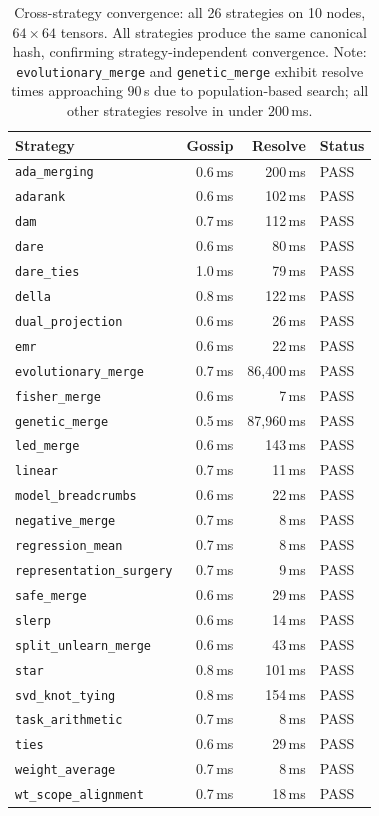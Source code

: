 \documentclass[10pt,letterpaper]{article}
\begin{document}
\begin{table}[htbp]
\centering
\caption{Cross-strategy convergence: all 26 strategies on 10 nodes, $64\times 64$ tensors.
All strategies produce the same canonical hash, confirming strategy-independent convergence.
Note: \texttt{evolutionary\_merge} and \texttt{genetic\_merge} exhibit resolve times approaching $90$\,s due to population-based search; all other strategies resolve in under $200$\,ms.}
\label{tab:strategy_sweep}
\footnotesize
\begin{tabular}{lrrl}
\toprule
Strategy & Gossip & Resolve & Status \\
\midrule
\texttt{ada\_merging} & 0.6\,ms & 200\,ms & PASS \\
\texttt{adarank} & 0.6\,ms & 102\,ms & PASS \\
\texttt{dam} & 0.7\,ms & 112\,ms & PASS \\
\texttt{dare} & 0.6\,ms & 80\,ms & PASS \\
\texttt{dare\_ties} & 1.0\,ms & 79\,ms & PASS \\
\texttt{della} & 0.8\,ms & 122\,ms & PASS \\
\texttt{dual\_projection} & 0.6\,ms & 26\,ms & PASS \\
\texttt{emr} & 0.6\,ms & 22\,ms & PASS \\
\texttt{evolutionary\_merge} & 0.7\,ms & 86{,}400\,ms & PASS \\
\texttt{fisher\_merge} & 0.6\,ms & 7\,ms & PASS \\
\texttt{genetic\_merge} & 0.5\,ms & 87{,}960\,ms & PASS \\
\texttt{led\_merge} & 0.6\,ms & 143\,ms & PASS \\
\texttt{linear} & 0.7\,ms & 11\,ms & PASS \\
\texttt{model\_breadcrumbs} & 0.6\,ms & 22\,ms & PASS \\
\texttt{negative\_merge} & 0.7\,ms & 8\,ms & PASS \\
\texttt{regression\_mean} & 0.7\,ms & 8\,ms & PASS \\
\texttt{representation\_surgery} & 0.7\,ms & 9\,ms & PASS \\
\texttt{safe\_merge} & 0.6\,ms & 29\,ms & PASS \\
\texttt{slerp} & 0.6\,ms & 14\,ms & PASS \\
\texttt{split\_unlearn\_merge} & 0.6\,ms & 43\,ms & PASS \\
\texttt{star} & 0.8\,ms & 101\,ms & PASS \\
\texttt{svd\_knot\_tying} & 0.8\,ms & 154\,ms & PASS \\
\texttt{task\_arithmetic} & 0.7\,ms & 8\,ms & PASS \\
\texttt{ties} & 0.6\,ms & 29\,ms & PASS \\
\texttt{weight\_average} & 0.7\,ms & 8\,ms & PASS \\
\texttt{wt\_scope\_alignment} & 0.7\,ms & 18\,ms & PASS \\
\bottomrule
\end{tabular}
\end{table}
\end{document}
